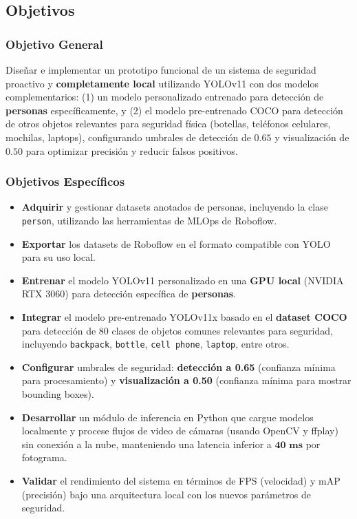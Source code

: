 \documentclass[12pt, a4paper]{article}
\begin{document}
\subsection{Objetivos}

\subsubsection{Objetivo General}
Diseñar e implementar un prototipo funcional de un sistema de seguridad proactivo y \textbf{completamente local} utilizando YOLOv11 con dos modelos complementarios: (1) un modelo personalizado entrenado para detección de \textbf{personas} específicamente, y (2) el modelo pre-entrenado COCO para detección de otros objetos relevantes para seguridad física (botellas, teléfonos celulares, mochilas, laptops), configurando umbrales de detección de $\mathbf{0.65}$ y visualización de $\mathbf{0.50}$ para optimizar precisión y reducir falsos positivos.

\subsubsection{Objetivos Específicos}
\begin{itemize}
\item \textbf{Adquirir} y gestionar datasets anotados de personas, incluyendo la clase \texttt{person}, utilizando las herramientas de MLOps de Roboflow.
\item \textbf{Exportar} los datasets de Roboflow en el formato compatible con YOLO para su uso local.
\item \textbf{Entrenar} el modelo YOLOv11 personalizado en una \textbf{GPU local} (NVIDIA RTX 3060) para detección específica de \textbf{personas}.
\item \textbf{Integrar} el modelo pre-entrenado YOLOv11x basado en el \textbf{dataset COCO} para detección de 80 clases de objetos comunes relevantes para seguridad, incluyendo \texttt{backpack}, \texttt{bottle}, \texttt{cell phone}, \texttt{laptop}, entre otros.
\item \textbf{Configurar} umbrales de seguridad: \textbf{detección a 0.65} (confianza mínima para procesamiento) y \textbf{visualización a 0.50} (confianza mínima para mostrar bounding boxes).
\item \textbf{Desarrollar} un módulo de inferencia en Python que cargue modelos localmente y procese flujos de video de cámaras (usando OpenCV y ffplay) sin conexión a la nube, manteniendo una latencia inferior a $\mathbf{40 \text{ ms}}$ por fotograma.
\item \textbf{Validar} el rendimiento del sistema en términos de FPS (velocidad) y mAP (precisión) bajo una arquitectura local con los nuevos parámetros de seguridad.
\end{itemize}
\end{document}
